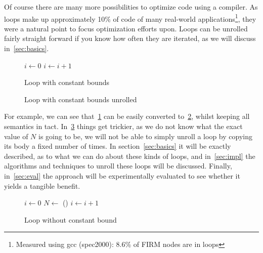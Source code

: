 Of course there are many more possibilities to optimize code using a compiler.
As loops make up approximately 10\% of code of many real-world applications\footnote{Measured using gcc (spec2000): 8.6\% of FIRM nodes are in loops}, they were a natural point to focus optimization efforts upon.
Loops can be unrolled fairly straight forward if you know how often they are iterated, as we will discuss in~\cref{sec:basics}.

\begin{figure}[h]
    \label{fig:intro:unroll-simple-before}
    \begin{algorithmic}
        \State $i \gets 0$
            \State {}
            \State $i \gets i + 1$
        \EndWhile
    \end{algorithmic}
    \caption{Loop with constant bounds}
\end{figure}
\begin{figure}[h]
    \begin{algorithmic}
        \State {}
        \State {}
        \State {}
        \State {}
        \State {}
    \end{algorithmic}
    \caption{Loop with constant bounds unrolled}
    \label{fig:intro:unroll-simple-after}
\end{figure}
For example, we can see that~\cref{fig:intro:unroll-simple-before} can be easily converted to~\cref{fig:intro:unroll-simple-after}, whilst keeping all semantics in tact.
In~\cref{fig:intro:unroll-nostatic-bound} things get trickier, as we do not know what the exact value of $N$ is going to be, we will not be able to simply unroll a loop by copying its body a fixed number of times.
In section~\cref{sec:basics} it will be exactly described, as to what we can do about these kinds of loops, and in~\cref{sec:impl} the algorithms and techniques to unroll these loops will be discussed.
Finally, in~\cref{sec:eval} the approach will be experimentally evaluated to see whether it yields a tangible benefit.
\begin{figure}[h]
    \begin{algorithmic}
        \State $i \gets 0$
        \State $N \gets$ () 
            \State {}
            \State $i \gets i + 1$
        \EndWhile
    \end{algorithmic}
    \caption{Loop without constant bound}
    \label{fig:intro:unroll-nostatic-bound}
\end{figure}

